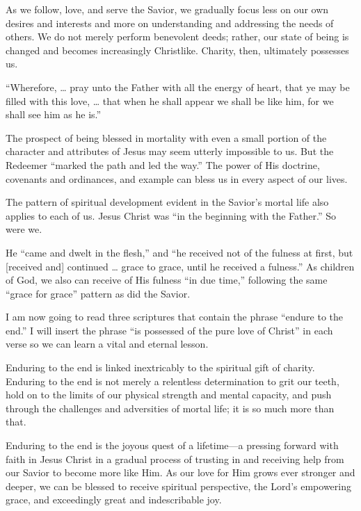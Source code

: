 \documentclass[letterpaper, 11pt]{report}
\newcommand{\intalkheader}[1]{
    \vspace{0.75em}
    \noindent{\normalsize\bfseries #1}
    \par\nopagebreak %
    \vspace{0.25em}
    \nopagebreak     %
}
\begin{document}
As we follow, love, and serve the Savior, we gradually focus less on our own desires and interests and more on understanding and addressing the needs of others. We do not merely perform benevolent deeds; rather, our state of being is changed and becomes increasingly Christlike. Charity, then, ultimately possesses us.

“Wherefore, … pray unto the Father with all the energy of heart, that ye may be filled with this love, … that when he shall appear we shall be like him, for we shall see him as he is.”

\intalkheader{Grace for Grace}

The prospect of being blessed in mortality with even a small portion of the character and attributes of Jesus may seem utterly impossible to us. But the Redeemer “marked the path and led the way.” The power of His doctrine, covenants and ordinances, and example can bless us in every aspect of our lives.

The pattern of spiritual development evident in the Savior’s mortal life also applies to each of us. Jesus Christ was “in the beginning with the Father.” So were we.

He “came and dwelt in the flesh,” and “he received not of the fulness at first, but [received and] continued … grace to grace, until he received a fulness.” As children of God, we also can receive of His fulness “in due time,” following the same “grace for grace” pattern as did the Savior.

\intalkheader{Scriptural Examples}

I am now going to read three scriptures that contain the phrase “endure to the end.” I will insert the phrase “is possessed of the pure love of Christ” in each verse so we can learn a vital and eternal lesson.

Enduring to the end is linked inextricably to the spiritual gift of charity. Enduring to the end is not merely a relentless determination to grit our teeth, hold on to the limits of our physical strength and mental capacity, and push through the challenges and adversities of mortal life; it is so much more than that.

Enduring to the end is the joyous quest of a lifetime—a pressing forward with faith in Jesus Christ in a gradual process of trusting in and receiving help from our Savior to become more like Him. As our love for Him grows ever stronger and deeper, we can be blessed to receive spiritual perspective, the Lord’s empowering grace, and exceedingly great and indescribable joy.
\end{document}
